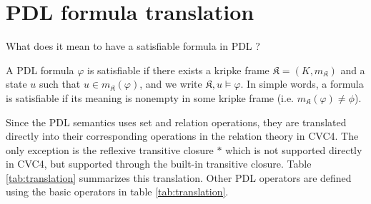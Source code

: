 \documentclass[12pt,a4paper]{article}
\begin{document}
\section{PDL formula translation}

What does it mean to have a satisfiable formula in PDL ?

A PDL formula $\varphi$ is satisfiable if there exists a kripke frame $\mathfrak{K}=(K, m_{\mathfrak{K}})$ and a state  $u$ such that $u \in m_{\mathfrak{K}}(\varphi) $, and we write $\mathfrak{K}, u \models \varphi$. In simple words, a formula is satisfiable if its meaning is nonempty in some kripke frame (i.e. $m_{\mathfrak{K}}(\varphi) \neq \phi$). 

Since the PDL semantics uses set and relation operations, they are translated directly into their corresponding operations in the relation theory in CVC4. The only exception is the reflexive transitive closure $*$ which is not supported directly in CVC4, but supported through the built-in transitive closure. Table \ref{tab:translation} summarizes this translation. Other PDL operators are defined using the basic operators in table \ref{tab:translation}. 
\end{document}
